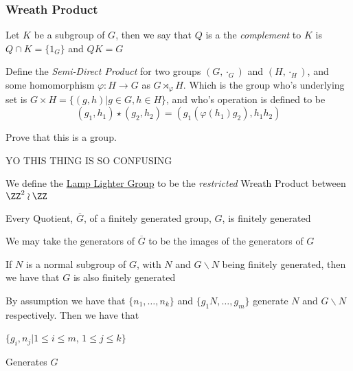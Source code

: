     \subsubsection{Wreath Product}
    \begin{definition}
        Let $K$ be a subgroup of $G$, then we say that $Q$ is a the \textit{complement} to $K$ is $Q\cap K = \{1_G\}$ and $QK = G$
        
    \end{definition}
    \begin{definition}
        Define the \textit{Semi-Direct Product} for two groups $(G,\cdot_G)$ and $(H,\cdot_H)$, and some homomorphism $\varphi: H\to G$ as $G\rtimes_\varphi H$. Which is the group who's underlying set is $G\times H = \{(g,h)\vert g\in G, h\in H\}$, and who's operation is defined to be 
        \[(g_1,h_1)\star(g_2,h_2) = (g_1(\varphi(h_1)g_2),h_1h_2)\]
    \end{definition}
    \begin{exercise}
        Prove that this is a group.
    \end{exercise}
    \begin{definition}
    YO THIS THING IS SO CONFUSING
    \end{definition}
    \begin{example}
        We define the \href{https://en.wikipedia.org/wiki/Lamplighter_group}{Lamp Lighter Group} to be the \textit{restricted} Wreath Product between $\ZZ^2\wr\ZZ$
    \end{example}
    \BBreak
    \begin{proposition}
        Every Quotient, $\overline{G}$, of a finitely generated group, $G$, is finitely generated
    \end{proposition}
    We may take the generators of $\overline{G}$ to be the images of the generators of $G$
    \begin{proposition}
        If $N$ is a normal subgroup of $G$, with $N$ and $G\backslash N$ being finitely generated, then we have that $G$ is also finitely generated
    \end{proposition}
    By assumption we have that $\{n_1,\ldots,n_k\}$ and $\{g_1N,\ldots,g_m\}$ generate $N$ and $G\backslash N$ respectively. Then we have that
    \begin{center}
        $\{g_i,n_j\vert1\leq i\leq m$, $1\leq j\leq k\}$
    \end{center}
    Generates $G$
    \BBreak
